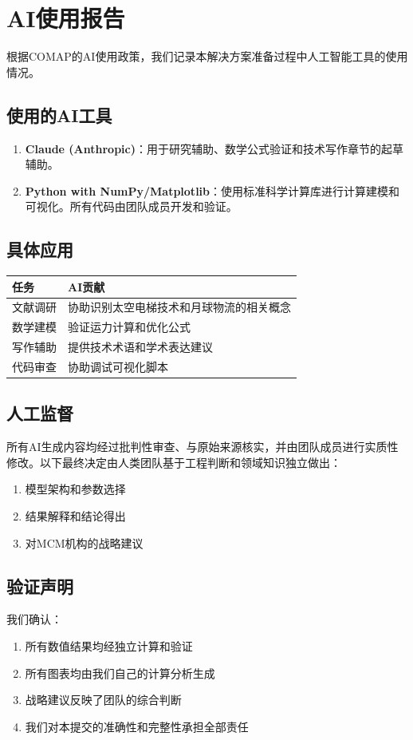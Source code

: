 \newpage
\section*{AI使用报告}

根据COMAP的AI使用政策，我们记录本解决方案准备过程中人工智能工具的使用情况。

\subsection*{使用的AI工具}

\begin{enumerate}
    \item \textbf{Claude (Anthropic)}：用于研究辅助、数学公式验证和技术写作章节的起草辅助。
    
    \item \textbf{Python with NumPy/Matplotlib}：使用标准科学计算库进行计算建模和可视化。所有代码由团队成员开发和验证。
\end{enumerate}

\subsection*{具体应用}

\begin{table}[htbp]
    \centering
    \begin{tabular}{lp{8cm}}
        \toprule
        任务 & AI贡献 \\
        \midrule
        文献调研 & 协助识别太空电梯技术和月球物流的相关概念 \\
        数学建模 & 验证运力计算和优化公式 \\
        写作辅助 & 提供技术术语和学术表达建议 \\
        代码审查 & 协助调试可视化脚本 \\
        \bottomrule
    \end{tabular}
\end{table}

\subsection*{人工监督}

所有AI生成内容均经过批判性审查、与原始来源核实，并由团队成员进行实质性修改。以下最终决定由人类团队基于工程判断和领域知识独立做出：
\begin{enumerate}
    \item 模型架构和参数选择
    \item 结果解释和结论得出
    \item 对MCM机构的战略建议
\end{enumerate}

\subsection*{验证声明}

我们确认：
\begin{enumerate}
    \item 所有数值结果均经独立计算和验证
    \item 所有图表均由我们自己的计算分析生成
    \item 战略建议反映了团队的综合判断
    \item 我们对本提交的准确性和完整性承担全部责任
\end{enumerate}
